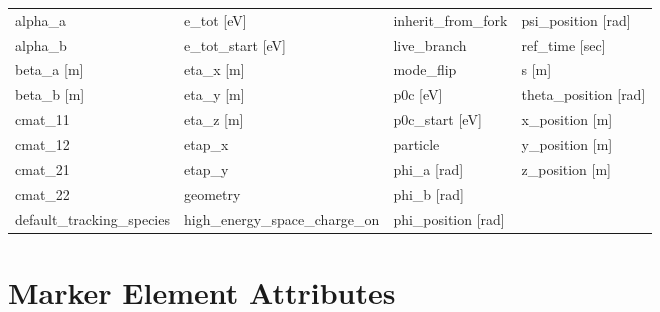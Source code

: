  \begin{tabular}{llll} \toprule
alpha_a                          & e_tot [eV]                       & inherit_from_fork                & psi_position [rad]               \\
alpha_b                          & e_tot_start [eV]                 & live_branch                      & ref_time [sec]                   \\
beta_a [m]                       & eta_x [m]                        & mode_flip                        & s [m]                            \\
beta_b [m]                       & eta_y [m]                        & p0c [eV]                         & theta_position [rad]             \\
cmat_11                          & eta_z [m]                        & p0c_start [eV]                   & x_position [m]                   \\
cmat_12                          & etap_x                           & particle                         & y_position [m]                   \\
cmat_21                          & etap_y                           & phi_a [rad]                      & z_position [m]                   \\
cmat_22                          & geometry                         & phi_b [rad]                      &                                  \\
default_tracking_species         & high_energy_space_charge_on      & phi_position [rad]               &                                  \\
 \bottomrule
 \end{tabular}
 \vfill
 
 \section{Marker Element Attributes}
 \label{s:list.marker}
 
